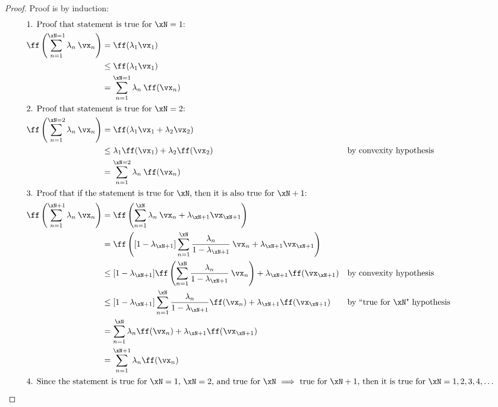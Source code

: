\begin{proof}
Proof is by induction:
\begin{align*}
  \intertext{1. Proof that statement is true for $\xN=1$:} 
    \ff\left(\sum_{n=1}^{\xN=1} \lambda_n \: \vx_n\right) 
      &=   \ff(\lambda_1 \vx_1) 
    \\&\le \ff(\lambda_1 \vx_1) 
    \\&=   \sum_{n=1}^{\xN=1} \lambda_n\:\ff(\vx_n)
    \\
  \intertext{2. Proof that statement is true for $\xN=2$:} 
    \ff\left(\sum_{n=1}^{\xN=2} \lambda_n \: \vx_n\right) 
      &=   \ff(\lambda_1 \vx_1 + \lambda_2\vx_2) 
    \\&\le \lambda_1 \ff(\vx_1) + \lambda_2 \ff(\vx_2)
      &&   \text{by convexity hypothesis}
    \\&=   \sum_{n=1}^{\xN=2} \lambda_n\:\ff(\vx_n)
    \\
  \intertext{3. Proof that if the statement is true for $\xN$, then it is also true for $\xN+1$:} 
    \ff\left(\sum_{n=1}^{\xN+1} \lambda_n \: \vx_n\right) 
      &=   \ff\left(\sum_{n=1}^{\xN} \lambda_n \: \vx_n + \lambda_{\xN+1}\vx_{\xN+1}\right) 
    \\&=   \ff\left([1-\lambda_{\xN+1}]\sum_{n=1}^{\xN} \frac{\lambda_n}{1-\lambda_{\xN+1}} \: \vx_n + \lambda_{\xN+1}\vx_{\xN+1}\right) 
    \\&\le [1-\lambda_{\xN+1}]\ff\left(\sum_{n=1}^{\xN} \frac{\lambda_n}{1-\lambda_{\xN+1}} \: \vx_n \right) 
         + \lambda_{\xN+1}\ff(\vx_{\xN+1}) 
      &&   \text{by convexity hypothesis}
    \\&\le [1-\lambda_{\xN+1}]\sum_{n=1}^{\xN} \frac{\lambda_n}{1-\lambda_{\xN+1}}\ff(\vx_n) 
         + \lambda_{\xN+1}\ff(\vx_{\xN+1}) 
      &&   \text{by ``true for $\xN$" hypothesis}
    \\&=   \sum_{n=1}^{\xN} \lambda_n \ff(\vx_n) + \lambda_{\xN+1}\ff(\vx_{\xN+1}) 
    \\&=   \sum_{n=1}^{\xN+1} \lambda_n \ff(\vx_n)
    \\
  \intertext{4. Since the statement is true for $\xN=1$, $\xN=2$, and 
                true for $\xN$ $\implies$ true for $\xN+1$,
                then it is true for $\xN=1,2,3,4,\ldots$}
\end{align*}
\end{proof}



